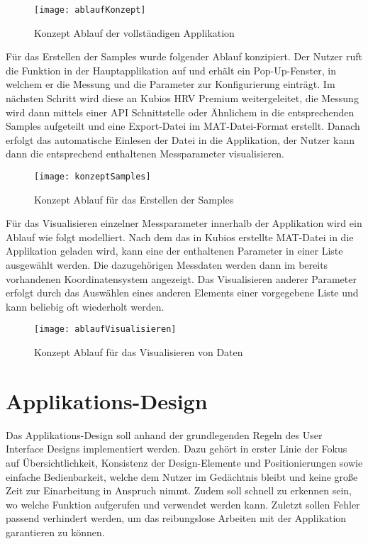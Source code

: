 \begin{figure}[H]
	\centering
	\texttt{[image: ablaufKonzept]}
	\caption{Konzept Ablauf der vollständigen Applikation}
	\label{fig:ablaufKonzept}
\end{figure}

Für das Erstellen der Samples wurde folgender Ablauf konzipiert. Der Nutzer ruft die Funktion in der Hauptapplikation auf und erhält ein Pop-Up-Fenster, in welchem er die Messung und die Parameter zur Konfigurierung einträgt. Im nächsten Schritt wird diese an Kubios HRV Premium weitergeleitet, die Messung wird dann mittels einer API Schnittstelle oder Ähnlichem in die entsprechenden Samples aufgeteilt und eine Export-Datei im MAT-Datei-Format erstellt. Danach erfolgt das automatische Einlesen der Datei in die Applikation, der Nutzer kann dann die entsprechend enthaltenen Messparameter visualisieren.

\begin{figure}[H]
	\centering
	\texttt{[image: konzeptSamples]}
	\caption{Konzept Ablauf für das Erstellen der Samples}
	\label{fig:konzeptSamples}
\end{figure}

Für das Visualisieren einzelner Messparameter innerhalb der Applikation wird ein Ablauf wie folgt modelliert. Nach dem das in Kubios erstellte MAT-Datei in die Applikation geladen wird, kann eine der enthaltenen Parameter in einer Liste ausgewählt werden. Die dazugehörigen Messdaten werden dann im bereits vorhandenen Koordinatensystem angezeigt. Das Visualisieren anderer Parameter erfolgt durch das Auswählen eines anderen Elements einer vorgegebene Liste und kann beliebig oft wiederholt werden. 

\begin{figure}[H]
	\centering
	\texttt{[image: ablaufVisualisieren]}
	\caption{Konzept Ablauf für das Visualisieren von Daten}
	\label{fig:ablaufVisualisieren}
\end{figure}

\section{Applikations-Design}

Das Applikations-Design soll anhand der grundlegenden Regeln des User Interface Designs implementiert werden. Dazu gehört in erster Linie der Fokus auf Übersichtlichkeit, Konsistenz der Design-Elemente und Positionierungen sowie einfache Bedienbarkeit, welche dem Nutzer im Gedächtnis bleibt und keine große Zeit zur Einarbeitung in Anspruch nimmt. Zudem soll schnell zu erkennen sein, wo welche Funktion aufgerufen und verwendet werden kann. Zuletzt sollen Fehler passend verhindert werden, um das reibungslose Arbeiten mit der Applikation garantieren zu können.

